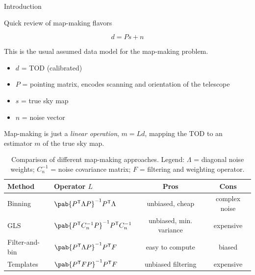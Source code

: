 \documentclass[final]{beamer}
\newcommand{\transpose}[1]{\ensuremath{#1^{\mathsf T}}}
\newlength{\colwidth}
\begin{document}
\begin{frame}[t]
\begin{columns}[t]
\begin{column}{\colwidth}
\begin{block}{Introduction}
      \end{block}

      \begin{block}{Quick review of map-making flavors}


        \begin{equation}\label{eq:data_model}
          d = P s + n
        \end{equation}

        This is the usual assumed data model for the map-making problem.

        \begin{itemize}
          \item $d$ = TOD (calibrated)
          \item $P$ = pointing matrix, encodes scanning and orientation of the telescope
          \item $s$ = true sky map
          \item $n$ = noise vector
        \end{itemize}

        Map-making is just a \emph{linear operation}, $m = Ld$, mapping the TOD to an estimator $m$ of the true sky map.

        \begin{table}
          \centering
          \begin{tabular}{l l c c}
            \toprule
            \textbf{Method} & \textbf{Operator} $L$                                            & \textbf{Pros}           & \textbf{Cons} \\
            \midrule
            Binning         & \( \pab{\transpose{P} \Lambda P}^{-1} \transpose{P} \Lambda \)   & unbiased, cheap         & complex noise \\
            \midrule
            GLS             & \( \pab{\transpose{P} C_n^{-1} P}^{-1} \transpose{P} C_n^{-1} \) & unbiased, min. variance & expensive     \\
            \midrule
            Filter-and-bin  & \( \pab{\transpose{P} {\Lambda P}}^{-1} \transpose{P} F \)       & easy to compute         & biased        \\
            \midrule
            Templates       & \( \pab{\transpose{P} F P}^{-1} \transpose{P} F \)               & unbiased filtering      & expensive     \\ %
            \bottomrule
          \end{tabular}
          \caption{Comparison of different map-making approaches. Legend: $\Lambda$ = diagonal noise weights; $C_n^{-1}$ = noise covariance matrix; $F$ = filtering and weighting operator.}
        \end{table}


\end{block}
\end{column}
\end{columns}
\end{frame}
\end{document}
